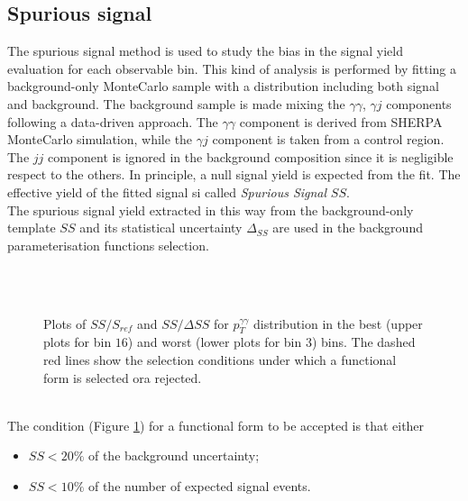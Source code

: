 \subsection{Spurious signal}
\label{spur_sign_sec}
The spurious signal method is used to study the bias in the signal yield evaluation for each observable bin. This kind of analysis is performed by fitting a background-only MonteCarlo sample with a distribution including both signal and background. The background sample is made mixing the $\gamma\gamma$, $\gamma j$ components following a data-driven approach. The $\gamma\gamma$ component is derived from S{\scriptsize HERPA} MonteCarlo simulation, while the $\gamma j$ component is taken from a control region. The $jj$ component is ignored in the background composition since it is negligible respect to the others. In principle, a null signal yield is expected from the fit. The effective yield of the fitted signal si called \emph{Spurious Signal} $SS$.
\\
The spurious signal yield extracted in this way from the background-only template $SS$ and its statistical uncertainty $\Delta_{SS}$ are used in the background parameterisation functions selection.
\begin{figure}[b!]
\centering
{}
 \\
 \\
\caption{Plots of $SS/S_{ref}$ and $SS/\Delta SS$ for $p_T^{\gamma\gamma}$ distribution in the best (upper plots for bin $16$) and worst (lower plots for bin $3$) bins. The dashed red lines show the selection conditions under which a functional form is selected ora rejected.}
\label{SS_example}
\end{figure}
\\The condition (Figure \ref{SS_example}) for a functional form to be accepted is that either
\begin{itemize}
\item $SS < 20 \%$ of the background uncertainty;
\item $SS < 10 \%$ of the number of expected signal events.
\end{itemize}
